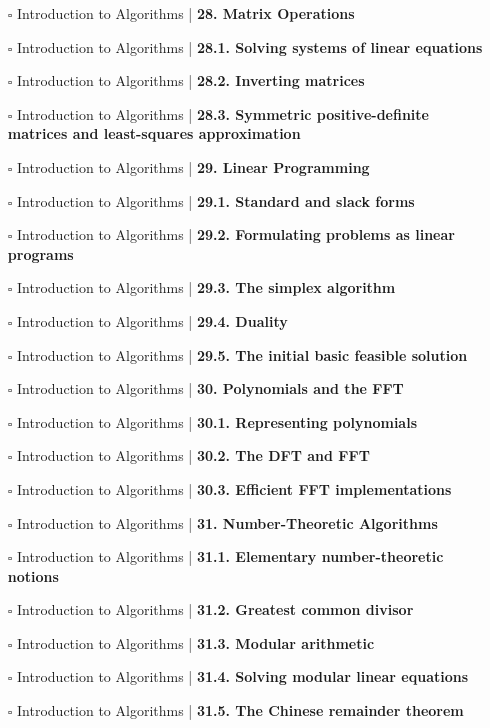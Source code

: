 \documentclass[a4, landscape, 12pt]{article}
\newcommand{\checkbox}{$\square$}%
\begin{document}
\begin{itemize}
{}
\item [\checkbox]  Introduction to Algorithms | \textbf{ 28. Matrix Operations
}
\item [\checkbox]  Introduction to Algorithms | \textbf{ 28.1. Solving systems of linear equations
}
\item [\checkbox]  Introduction to Algorithms | \textbf{ 28.2. Inverting matrices
}
\item [\checkbox]  Introduction to Algorithms | \textbf{ 28.3. Symmetric positive-definite matrices and least-squares approximation
}
\item [\checkbox]  Introduction to Algorithms | \textbf{ 29. Linear Programming
}
\item [\checkbox]  Introduction to Algorithms | \textbf{ 29.1. Standard and slack forms
}
\item [\checkbox]  Introduction to Algorithms | \textbf{ 29.2. Formulating problems as linear programs
}
\item [\checkbox]  Introduction to Algorithms | \textbf{ 29.3. The simplex algorithm
}
\item [\checkbox]  Introduction to Algorithms | \textbf{ 29.4. Duality
}
\item [\checkbox]  Introduction to Algorithms | \textbf{ 29.5. The initial basic feasible solution
}
\item [\checkbox]  Introduction to Algorithms | \textbf{ 30. Polynomials and the FFT
}
\item [\checkbox]  Introduction to Algorithms | \textbf{ 30.1. Representing polynomials
}
\item [\checkbox]  Introduction to Algorithms | \textbf{ 30.2. The DFT and FFT
}
\item [\checkbox]  Introduction to Algorithms | \textbf{ 30.3. Efficient FFT implementations
}
\item [\checkbox]  Introduction to Algorithms | \textbf{ 31. Number-Theoretic Algorithms
}
\item [\checkbox]  Introduction to Algorithms | \textbf{ 31.1. Elementary number-theoretic notions
}
\item [\checkbox]  Introduction to Algorithms | \textbf{ 31.2. Greatest common divisor
}
\item [\checkbox]  Introduction to Algorithms | \textbf{ 31.3. Modular arithmetic
}
\item [\checkbox]  Introduction to Algorithms | \textbf{ 31.4. Solving modular linear equations
}
\item [\checkbox]  Introduction to Algorithms | \textbf{ 31.5. The Chinese remainder theorem
}
\end{itemize}
\end{document}
